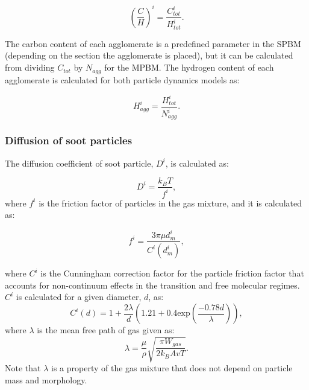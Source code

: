 \begin{equation}
	\left(
	\frac{C}{H}
	\right)^i
	=\frac{C^i_{tot}}{H^i_{tot}}   
	\label{eqn:CtoH}.
\end{equation}

The carbon content of each agglomerate is a predefined parameter in the SPBM (depending on the section the agglomerate is placed), but it can be calculated from dividing ${C_{tot}}$ by ${N_{agg}}$ for the MPBM. The hydrogen content of each agglomerate is calculated for both particle dynamics models as:

\begin{equation}
	H^i_{agg}
	=\frac{H^i_{tot}}{N^i_{agg}}   
	\label{eqn:Hagg}.
\end{equation}


\subsubsection{Diffusion of soot particles}
The diffusion coefficient of soot particle, $D^i$, is calculated as:

\begin{equation}
	D^i = \frac{k_B T}{f^i}
	\label{eqn:diff},
\end{equation}
\noindent where $f^i$ is the friction factor of particles in the gas mixture, and it is calculated as:

\begin{equation}
	f^i = \frac{3\pi\mu d^i_m}{C^i(d^i_m)},
	\label{eqn:fraction}
\end{equation}

\noindent where ${C^i}$ is the Cunningham correction factor for the particle friction factor that accounts for non-continuum effects in the transition and free molecular regimes. ${C^i}$ is calculated for a given diameter, $d$, as: 
\begin{equation}
	C^i(d) = 1+\frac{2\lambda}{d}
	\left(
	1.21+0.4\mathrm{exp}(\frac{-0.78d}{\lambda})
	\right)
	\label{eqn:cun},
\end{equation}
\noindent  where $\lambda$ is the mean free path of gas given as:
\begin{equation}
	\lambda = \frac{\mu}{\rho}\sqrt{\frac{\pi W_{gas}}{2k_B Av T}}
	\label{eqn:lambda}.
\end{equation}
Note that $\lambda$ is a property of the gas mixture that does not depend on particle mass and morphology. 


